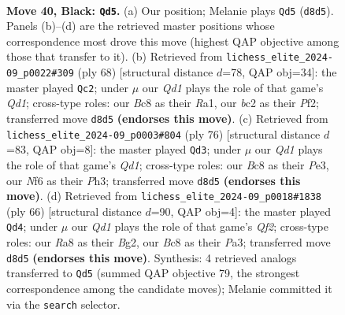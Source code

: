 \documentclass[11pt]{article}
\begin{document}
\begin{figure}[p]
\label{fig:thought-m77}
\end{figure}

\clearpage

\begin{figure}[p]\centering
\begin{subfigure}{0.46\textwidth}\centering
\resizebox{\linewidth}{!}{%
\newchessgame
\chessboard[
  setfen={r1bq3k/ppp2pp1/5n2/7p/1B6/4QPbP/PPB3P1/R5K1 b - - 1 40},
  showmover=false,
  pgfstyle=straightmove, color=movearrow, markmove={d8-d5}
]}
\caption{}
\end{subfigure}\hfill
\begin{subfigure}{0.46\textwidth}\centering
\resizebox{\linewidth}{!}{%
\newchessgame
\chessboard[
  setfen={1q4k1/1r3p2/2p1p1p1/p1P1P1b1/3B3p/2P4P/5PP1/R2Q2K1 w - - 4 35},
  showmover=false,
  pgfstyle=straightmove, color=movearrow, markmove={d1-c2}
]}
\caption{}
\end{subfigure}
\\[4pt]
\begin{subfigure}{0.46\textwidth}\centering
\resizebox{\linewidth}{!}{%
\newchessgame
\chessboard[
  setfen={2r4k/3q2p1/2Nb1p1p/1P1p4/1p1B4/1P2P2P/5PP1/3Q2K1 w - - 2 39},
  showmover=false,
  pgfstyle=straightmove, color=movearrow, markmove={d1-d3}
]}
\caption{}
\end{subfigure}\hfill
\begin{subfigure}{0.46\textwidth}\centering
\resizebox{\linewidth}{!}{%
\newchessgame
\chessboard[
  setfen={4r1k1/3q1p1p/p2P2p1/1p1N2Pn/5P2/Pb5P/1B3QB1/6K1 w - - 0 34},
  showmover=false,
  pgfstyle=straightmove, color=movearrow, markmove={f2-d4}
]}
\caption{}
\end{subfigure}
\caption{\textbf{Move 40, Black: \texttt{Qd5}.} (a) Our position; Melanie plays \texttt{Qd5} (\texttt{d8d5}). Panels (b)--(d) are the retrieved master positions whose correspondence most drove this move (highest QAP objective among those that transfer to it). (b) Retrieved from \texttt{lichess\_elite\_2024-09\_p0022\#309} (ply 68) [structural distance $d$=78, QAP obj=34]: the master played \texttt{Qc2}; under $\mu$ our \emph{Qd1} plays the role of that game's \emph{Qd1}; cross-type roles: our \emph{B}c8 as their \emph{R}a1, our \emph{b}c2 as their \emph{P}f2; transferred move \texttt{d8d5} \textbf{(endorses this move)}. (c) Retrieved from \texttt{lichess\_elite\_2024-09\_p0003\#804} (ply 76) [structural distance $d$=83, QAP obj=8]: the master played \texttt{Qd3}; under $\mu$ our \emph{Qd1} plays the role of that game's \emph{Qd1}; cross-type roles: our \emph{B}c8 as their \emph{P}e3, our \emph{N}f6 as their \emph{P}h3; transferred move \texttt{d8d5} \textbf{(endorses this move)}. (d) Retrieved from \texttt{lichess\_elite\_2024-09\_p0018\#1838} (ply 66) [structural distance $d$=90, QAP obj=4]: the master played \texttt{Qd4}; under $\mu$ our \emph{Qd1} plays the role of that game's \emph{Qf2}; cross-type roles: our \emph{R}a8 as their \emph{B}g2, our \emph{B}c8 as their \emph{P}a3; transferred move \texttt{d8d5} \textbf{(endorses this move)}. Synthesis: 4 retrieved analogs transferred to \texttt{Qd5} (summed QAP objective 79, the strongest correspondence among the candidate moves); Melanie committed it via the \texttt{search} selector.}

\end{figure}
\end{document}
